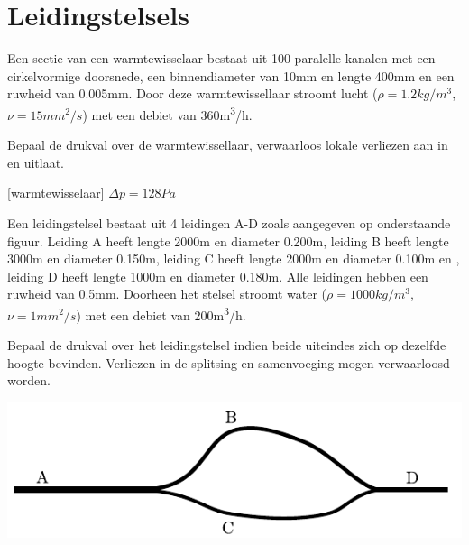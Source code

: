 \chapter{Leidingstelsels}
\label{sec:Leidingstelsels}
\begin{toepassing}[*]
	\label{warmtewisselaar}
Een sectie van een warmtewisselaar bestaat uit 100 paralelle kanalen met een cirkelvormige doorsnede, een binnendiameter van 10\unit{mm} en lengte 400\unit{mm} en een ruwheid van 0.005\unit{mm}. Door deze warmtewissellaar stroomt lucht ($\rho=1.2\unit{kg/m^3}$, $\nu=15\unit{mm^2/s}$) met een debiet van 360\unit{m^3/h}.
		
Bepaal de drukval over de warmtewissellaar, verwaarloos lokale verliezen aan in en uitlaat.	
\end{toepassing}
\begin{antwoord}{\ref{warmtewisselaar}}
	$\Delta p = 128\unit{Pa}$
\end{antwoord}
\begin{toepassing}[*]
	\label{serie parallel}
Een leidingstelsel bestaat uit 4 leidingen A-D zoals aangegeven op onderstaande figuur. Leiding A heeft lengte 2000\unit{m} en diameter 0.200\unit{m}, leiding B heeft lengte 3000\unit{m} en diameter 0.150\unit{m}, leiding C heeft lengte 2000\unit{m} en diameter 0.100\unit{m} en , leiding D heeft lengte 1000\unit{m} en diameter 0.180\unit{m}. Alle leidingen hebben een ruwheid van 0.5\unit{mm}. Doorheen het stelsel stroomt water ($\rho=1000\unit{kg/m^3}$, $\nu=1\unit{mm^2/s}$) met een debiet van 200\unit{m^3/h}.

Bepaal de drukval over het leidingstelsel indien beide uiteindes zich op dezelfde hoogte bevinden. Verliezen in de splitsing en samenvoeging mogen verwaarloosd worden.

	\centering
	\includegraphics{fig/leidingstelsels/serie_parallel}
\end{toepassing}
